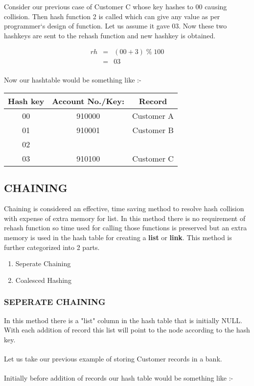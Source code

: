 \documentclass[12pt,a4paper]{article}
\begin{document}
\noindent Consider our previous case of Customer C whose key hashes to 00 causing collision. Then hash function 2 is called which can give any value as per programmer`s design of function. Let us assume it gave 03. Now these two hashkeys are sent to the rehash function and new hashkey is obtained.

\begin{eqnarray*}
rh&=&(00 + 3)\;\%\;100 \\
&=&03 \\
\end{eqnarray*}

\noindent Now our hashtable would be something like :-

\FloatBarrier
\begin{table}[H]

	\centering	
	\begin{tabular}{|c|c|c|} %

	\hline
	\textbf{Hash key} & \textbf{Account No./Key:} & \textbf{Record} \\

	\hline
	00 & 910000 & Customer A \\
	01 & 910001 & Customer B \\
	02 & & \\
	03 & 910100 & Customer C \\
	\hline

	\end{tabular}

\end{table}
\FloatBarrier

\subsection{CHAINING}

Chaining is considered an effective, time saving method to resolve hash collision with expense of extra memory for list. In this method there is no requirement of rehash function so time used for calling those functions is preserved but an extra memory is used in the hash table for creating a \textbf{list} or \textbf{link}. This method is further categorized into 2 parts.

\begin{enumerate}
	\item Seperate Chaining
	\item Coalesced Hashing
\end{enumerate}

\subsubsection{SEPERATE CHAINING}
In this method there is a "list" column in the hash table that is initially NULL. With each addition of record this list will point to the node according to the hash key. \\ \\
Let us take our previous example of storing Customer records in a bank. \\ \\
Initially before addition of records our hash table would be something like :-
\end{document}
